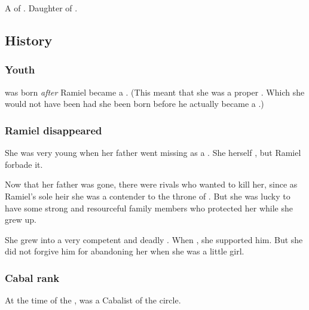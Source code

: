 \section{\Cishiel}
\index{\Cishiel}
A \ketheran{} \resvil{} of \Mystraacht. 
Daughter of . 









\subsection{History}





\subsubsection{Youth}
\Cishiel{} was born \emph{after} Ramiel became a \sathariah. 
(This meant that she was a proper \ketheran. Which she would not have been had she been born before he actually became a \sathariah.) 





\subsubsection{Ramiel disappeared}
She was very young when her father went missing as a \malach. 
She herself , but Ramiel forbade it. 

Now that her father was gone, there were rivals who wanted to kill her, since as Ramiel's sole heir she was a contender to the throne of \Mystraacht. 
But she was lucky to have some strong and resourceful family members who protected her while she grew up. 

She grew into a very competent and deadly \resvil. 
When , she supported him. 
But she did not forgive him for abandoning her when she was a little girl. 





\subsubsection{Cabal rank}
At the time of the \thirdbanewar, \Cishiel was a Cabalist of the \cishielcircle circle. 









